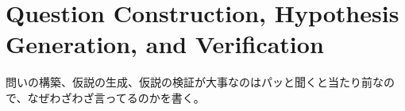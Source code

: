 \section{Question Construction, Hypothesis Generation, and  Verification}

問いの構築、仮説の生成、仮説の検証が大事なのはパッと聞くと当たり前なので、なぜわざわざ言ってるのかを書く。








